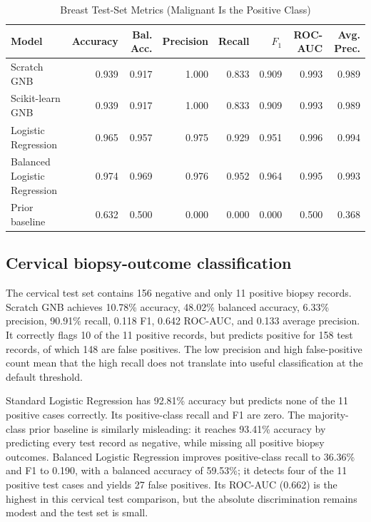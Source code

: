 \documentclass[conference]{IEEEtran}
\begin{document}
\begin{table}[!t]
\centering
\caption{Breast Test-Set Metrics (Malignant Is the Positive Class)}
\label{tab:breastmetrics}
\scriptsize
\setlength{\tabcolsep}{5pt}
\begin{tabular}{lrrrrrrr}
\toprule
Model & Accuracy & Bal. Acc. & Precision & Recall & $F_1$ & ROC-AUC & Avg. Prec. \\
\midrule
Scratch GNB & 0.939 & 0.917 & 1.000 & 0.833 & 0.909 & 0.993 & 0.989 \\
Scikit-learn GNB & 0.939 & 0.917 & 1.000 & 0.833 & 0.909 & 0.993 & 0.989 \\
Logistic Regression & 0.965 & 0.957 & 0.975 & 0.929 & 0.951 & 0.996 & 0.994 \\
Balanced Logistic Regression & 0.974 & 0.969 & 0.976 & 0.952 & 0.964 & 0.995 & 0.993 \\
Prior baseline & 0.632 & 0.500 & 0.000 & 0.000 & 0.000 & 0.500 & 0.368 \\
\bottomrule
\end{tabular}
\end{table}

\subsection{Cervical biopsy-outcome classification}
The cervical test set contains 156 negative and only 11 positive biopsy records. Scratch GNB achieves 10.78\% accuracy, 48.02\% balanced accuracy, 6.33\% precision, 90.91\% recall, 0.118 F1, 0.642 ROC-AUC, and 0.133 average precision. It correctly flags 10 of the 11 positive records, but predicts positive for 158 test records, of which 148 are false positives. The low precision and high false-positive count mean that the high recall does not translate into useful classification at the default threshold.

Standard Logistic Regression has 92.81\% accuracy but predicts none of the 11 positive cases correctly. Its positive-class recall and F1 are zero. The majority-class prior baseline is similarly misleading: it reaches 93.41\% accuracy by predicting every test record as negative, while missing all positive biopsy outcomes. Balanced Logistic Regression improves positive-class recall to 36.36\% and F1 to 0.190, with a balanced accuracy of 59.53\%; it detects four of the 11 positive test cases and yields 27 false positives. Its ROC-AUC (0.662) is the highest in this cervical test comparison, but the absolute discrimination remains modest and the test set is small.
\end{document}
